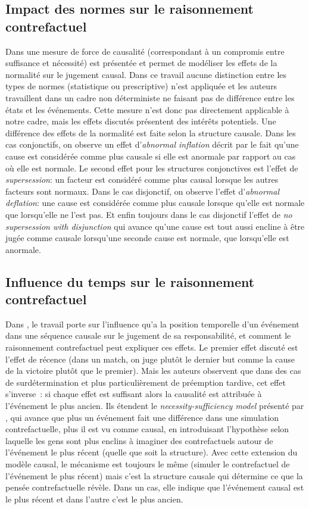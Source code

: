 \subsection{Impact des normes sur le raisonnement contrefactuel}
Dans \parencite{icard_normality_2017} une mesure de force de causalité (correspondant à un compromis entre suffisance et nécessité) est présentée et permet de modéliser les effets de la normalité sur le jugement causal. Dans ce travail aucune distinction entre les types de normes (statistique ou prescriptive) n'est appliquée et les auteurs travaillent dans un cadre non déterministe ne faisant pas de différence entre les états et les événements. Cette mesure n'est donc pas directement applicable à notre cadre, mais les effets discutés présentent des intérêts potentiels. Une différence des effets de la normalité est faite selon la structure causale. Dans les cas conjonctifs, on observe un effet d'\textit{abnormal inflation} décrit par le fait qu'une cause est considérée comme plus causale si elle est anormale par rapport au cas où elle est normale. Le second effet pour les structures conjonctives est l'effet de \textit{supersession}: un facteur est considéré comme plus causal lorsque les autres facteurs sont normaux. Dans le cas disjonctif, on observe l'effet d'\textit{abnormal deflation}: une cause est considérée comme plus causale lorsque qu'elle est normale que lorsqu'elle ne l'est pas. Et enfin toujours dans le cas disjonctif l'effet de \textit{no supersession with disjunction} qui avance qu'une cause  est tout aussi encline à être jugée comme causale lorsqu'une seconde cause est normale, que lorsqu'elle est anormale.

\subsection{Influence du temps sur le raisonnement contrefactuel}

Dans \parencite{henne_counterfactual_2021}, le travail porte sur l'influence qu'a la position temporelle d'un événement dans une séquence causale sur le jugement de sa responsabilité, et comment le raisonnement contrefactuel peut expliquer ces effets. Le premier effet discuté est l'effet de récence (dans un match, on juge plutôt le dernier but comme la cause de la victoire plutôt que le premier). Mais les auteurs observent que dans des cas de surdétermination et plus particulièrement de préemption tardive, cet effet s'inverse : si chaque effet est suffisant alors la causalité est attribuée à l'événement le plus ancien. Ils étendent le \textit{necessity-sufficiency model} présenté par \textcite{icard_normality_2017}, qui avance que plus un événement fait une différence dans une simulation contrefactuelle, plus il est vu comme causal, en introduisant l'hypothèse selon laquelle les gens sont plus enclins à imaginer des contrefactuels autour de l'événement le plus récent (quelle que soit la structure). Avec cette extension du modèle causal, le mécanisme est toujours le même (simuler le contrefactuel de l'événement le plus récent) mais c'est la structure causale qui détermine ce que la pensée contrefactuelle révèle. Dans un cas, elle indique que l'événement causal est le plus récent et dans l'autre c'est le plus ancien.

